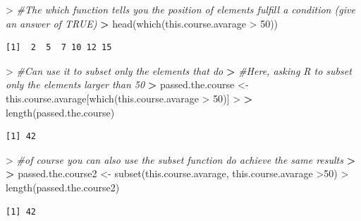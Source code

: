\documentclass[
]{book}
\newenvironment{Shaded}{\begin{snugshade}}{\end{snugshade}}
\newcommand{\CommentTok}[1]{\textcolor[rgb]{0.56,0.35,0.01}{\textit{#1}}}
\newcommand{\DecValTok}[1]{\textcolor[rgb]{0.00,0.00,0.81}{#1}}
\newcommand{\ErrorTok}[1]{\textcolor[rgb]{0.64,0.00,0.00}{\textbf{#1}}}
\newcommand{\FunctionTok}[1]{\textcolor[rgb]{0.00,0.00,0.00}{#1}}
\newcommand{\NormalTok}[1]{#1}
\newcommand{\OtherTok}[1]{\textcolor[rgb]{0.56,0.35,0.01}{#1}}
\newcommand{\SpecialCharTok}[1]{\textcolor[rgb]{0.00,0.00,0.00}{#1}}
\theoremstyle{definition}
\theoremstyle{definition}
\theoremstyle{definition}
\theoremstyle{definition}
\theoremstyle{remark}
\begin{document}
\begin{Shaded}
\begin{Highlighting}[]
\SpecialCharTok{\textgreater{}} \CommentTok{\#The which function tells you the position of elements fulfill a condition (give an answer of TRUE)}
\ErrorTok{\textgreater{}} \FunctionTok{head}\NormalTok{(}\FunctionTok{which}\NormalTok{(this.course.avarage }\SpecialCharTok{\textgreater{}} \DecValTok{50}\NormalTok{))}
\end{Highlighting}
\end{Shaded}

\begin{verbatim}
[1]  2  5  7 10 12 15
\end{verbatim}

\begin{Shaded}
\begin{Highlighting}[]
\SpecialCharTok{\textgreater{}} \CommentTok{\#Can use it to subset only the elements that do}
\ErrorTok{\textgreater{}} \CommentTok{\#Here, asking R to subset only the elements larger than 50}
\ErrorTok{\textgreater{}}\NormalTok{ passed.the.course }\OtherTok{\textless{}{-}}\NormalTok{ this.course.avarage[}\FunctionTok{which}\NormalTok{(this.course.avarage }\SpecialCharTok{\textgreater{}} \DecValTok{50}\NormalTok{)]}
\SpecialCharTok{\textgreater{}} 
\ErrorTok{\textgreater{}} \FunctionTok{length}\NormalTok{(passed.the.course)}
\end{Highlighting}
\end{Shaded}

\begin{verbatim}
[1] 42
\end{verbatim}

\begin{Shaded}
\begin{Highlighting}[]
\SpecialCharTok{\textgreater{}} \CommentTok{\#of course you can also use the subset function do achieve the same results}
\ErrorTok{\textgreater{}} 
\ErrorTok{\textgreater{}}\NormalTok{ passed.the.course2 }\OtherTok{\textless{}{-}} \FunctionTok{subset}\NormalTok{(this.course.avarage, this.course.avarage }\SpecialCharTok{\textgreater{}}\DecValTok{50}\NormalTok{)}
\SpecialCharTok{\textgreater{}} \FunctionTok{length}\NormalTok{(passed.the.course2)}
\end{Highlighting}
\end{Shaded}

\begin{verbatim}
[1] 42
\end{verbatim}
\end{document}
